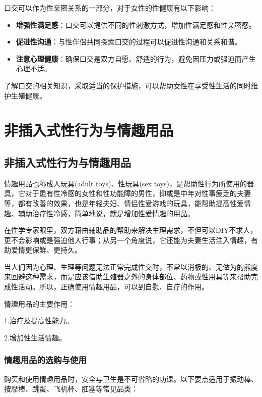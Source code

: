 \documentclass[12pt,UTF8]{ctexbook}
\begin{document}
口交可以作为性亲密关系的一部分，对于女性的性健康有以下影响：

\begin{itemize}
	\item \textbf{增强性满足感}：口交可以提供不同的性刺激方式，增加性满足感和性亲密感。
	\item \textbf{促进性沟通}：与性伴侣共同探索口交的过程可以促进性沟通和关系和谐。
	\item \textbf{注意心理健康}：确保口交是双方自愿、舒适的行为，避免因压力或强迫而产生心理不适。
\end{itemize}

了解口交的相关知识，采取适当的保护措施，可以帮助女性在享受性生活的同时维护生殖健康。

\chapter{非插入式性行为与情趣用品}

\section{非插入式性行为与情趣用品}

情趣用品也称成人玩具(adult toys)、性玩具(sex toys)，是帮助性行为所使用的器具，它对于患有性冷感的女性和性功能障的男性，抑或是中年对性事疲乏的夫妻等，都有改善的效果，也是年轻夫妇、情侣性爱游戏的玩具，能帮助提高性爱情趣、辅助治疗性冷感，简单地说，就是增加性爱情趣的用品。

在性学专家眼里，双方藉由辅助品的帮助来解决生理需求，不但可以DIY不求人，更不会影响或是强迫他人行事；从另一个角度说，它还能为夫妻生活注入情趣，有助爱情更保鮮、更持久。

当人们因为心理、生理等问题无法正常完成性交时，不常以消极的、无做为的熊度来回避这种需求，而是应该借助生殖器之外的身体部位、药物或性用具等来帮助完成性活动。所以，正确使用情趣用品，可以到自慰、自疗的作用。

情趣用品的主要作用：

1.治疗及提高性能力。

2.增加性生活情趣。

\subsection{情趣用品的选购与使用}

购买和使用情趣用品时，安全与卫生是不可省略的功课。以下要点适用于振动棒、按摩棒、跳蛋、飞机杯、肛塞等常见品类：
\end{document}
